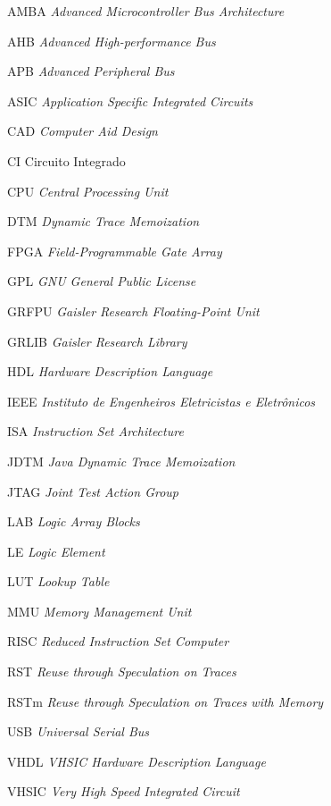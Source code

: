 \documentclass[
	11pt,				%
	openright,			%
	oneside,			%
	a4paper,			%
	english,			%
	french,				%
	spanish,			%
	brazil,				%
	]{abntex2}
\begin{document}
%
\begin{siglas}
  \item[AMBA] \textit{Advanced Microcontroller Bus Architecture}
  \item[AHB] \textit{Advanced High-performance Bus}
  \item[APB] \textit{Advanced Peripheral Bus}
  \item[ASIC] \textit{Application Specific Integrated Circuits}%
  \item[CAD] \textit{Computer Aid Design}
  \item[CI] Circuito Integrado
  \item[CPU] \textit{Central Processing Unit}%
  \item[DTM] \textit{Dynamic Trace Memoization}%
  \item[FPGA]  \textit{Field-Programmable Gate Array}
  \item[GPL] \textit{GNU General Public License}
  \item[GRFPU] \textit{Gaisler Research Floating-Point Unit}
  \item[GRLIB] \textit{Gaisler Research Library}
  \item[HDL] \textit{Hardware Description Language}
  \item[IEEE] \textit{Instituto de Engenheiros Eletricistas e Eletrônicos}
  \item[ISA] \textit{Instruction Set Architecture}%
  \item[JDTM] \textit{Java Dynamic Trace Memoization}%
  \item[JTAG] \textit{Joint Test Action Group}
  \item[LAB] \textit{Logic Array Blocks}
  \item[LE] \textit{Logic Element}
  \item[LUT] \textit{Lookup Table}
  \item[MMU] \textit{Memory Management Unit}
  \item[RISC] \textit{Reduced Instruction Set Computer}
  \item[RST] \textit{Reuse through Speculation on Traces}
  \item[RSTm] \textit{Reuse through Speculation on Traces with Memory}
  \item[USB] \textit{Universal Serial Bus}
  \item[VHDL] \textit{VHSIC Hardware Description Language}
  \item[VHSIC] \textit{Very High Speed Integrated Circuit}
\end{siglas}
\end{document}
